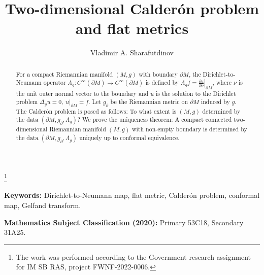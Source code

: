 \documentclass[12pt,reqno]{amsart}
\begin{document}

\title[Calder\'{o}n problem and flat metrics]{Two-dimensional Calder\'{o}n problem and flat metrics}
\author{Vladimir A. Sharafutdinov}
\address{Sobolev Institute of mathematics. 4 Koptyug av., Novosibirsk, 630090, Russia}
\thanks{The work was performed according to the Government research assignment
for IM SB RAS, project FWNF-2022-0006.}


\setcounter{section}{0}
\setcounter{page}{1}
\newtheorem{theorem}{Theorem}[section]
\newtheorem{lemma}[theorem]{Lemma}
\newtheorem{problem}[theorem]{Problem}
\newtheorem{proposition}[theorem]{Proposition}
\newtheorem{corollary}[theorem]{Corollary}
\newtheorem{conjecture}[theorem]{Conjecture}
\newtheorem{definition}[theorem]{Definition}
\newtheorem{remark}[theorem]{Remark}

\maketitle


\begin{abstract}
For a compact Riemannian manifold $(M,g)$ with boundary $\partial M$, the Diri\-chl\-et-to-Neumann operator
$\Lambda_g:C^\infty(\partial M)\longrightarrow C^\infty(\partial M)$ is defined by
$\Lambda_gf=\left.\frac{\partial u}{\partial\nu}\right|_{\partial M}$,
where $\nu$ is the unit outer normal vector to the boundary and $u$ is the solution to the Dirichlet problem
$\Delta_gu=0,\ u|_{\partial M}=f$.
Let $g_\partial$ be the Riemannian metric on $\partial M$ induced by $g$.
The Calder\'{o}n problem is posed as follows: To what extent is $(M,g)$ determined by the data $(\partial M,g_\partial,\Lambda_g)$?
We prove the uniqueness theorem: A compact connected two-dimensional Riemannian manifold $(M,g)$ with non-empty boundary is determined by the data $(\partial M,g_\partial,\Lambda_g)$ uniquely up to conformal equivalence.
\end{abstract}

\medskip

{\bf Keywords:} Dirichlet-to-Neumann map, flat metric, Calder\'{o}n problem, conformal map, Gelfand transform.

{\bf Mathematics Subject Classification (2020):} Primary 53C18, Secondary 31A25.
\end{document}
